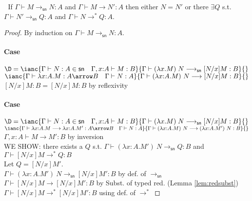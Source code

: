 \documentclass{article}
\newcommand{\csn}{\mathsf{sn}}
\newcommand{\mred}{\longrightarrow^*}
\newcommand{\red}{\longrightarrow}
\newcommand{\redsn}{\longrightarrow_\csn}
\begin{document}
\begin{lemma}[Confluence $\csn$]\label{lm:confsn}$\;$
If $\Gamma \vdash M \redsn N : A$ and $\Gamma \vdash M \red N' : A$
  then either $N = N'$ or
  there $\exists Q$ s.t. $\Gamma \vdash N'  \redsn Q : A$
        and $\Gamma \vdash N \mred Q : A$.
\end{lemma}
\begin{proof}
By induction on    $\Gamma \vdash M \redsn N : A$.

\paragraph{Case}
$\D = \ianc{\Gamma \vdash N : A \in \csn \quad \Gamma, x{:}A \vdash M : B}{\Gamma \vdash (\lambda x.M)\;N \redsn [N/x]M : B}{}$
\qquad
$\ianc{\Gamma \vdash \lambda x{:}A.M : A \arrow B \quad \Gamma \vdash  N : A}
      {\Gamma \vdash (\lambda x{:}A.M)~N  \red [N/x]M : B }{}$
\\[1em]
$[N/x]M : B = [N/x]M : B $ \hfill by reflexivity

\paragraph{Case}
$\D = \ianc{\Gamma \vdash N : A \in \csn \quad \Gamma, x{:}A \vdash M : B}{\Gamma \vdash (\lambda x.M)\;N \redsn [N/x]M : B}{}$
\qquad
$\ianc {\Gamma \vdash \lambda x{:}A.M \red \lambda x{:}A.M' : A \arrow B \quad \Gamma \vdash N : A}
       {\Gamma \vdash (\lambda x{:}A.M)~N  \red (\lambda x{:}A.M')~N : B}{}$
\\[0.5em]
$\Gamma, x{:}A \vdash M \red M' : B$ \hfill by inversion \\[0.5em]
WE SHOW: there exists a $Q$ s.t. $\Gamma \vdash (\lambda x{:}A.M')~N  \redsn Q : B$ and
                                 $\Gamma \vdash [N/x]M \mred Q : B$
\\[0.5em]
Let $Q = [N/x]M'$.  \\
$\Gamma \vdash (\lambda x{:}A.M')~N \redsn [N/x]M' : B$ \hfill by def. of $\redsn$\\
$\Gamma \vdash [N/x]M \red [N/x]M' : B$ \hfill by Subst. of typed red. (Lemma \ref{lem:redsubst})\\
$\Gamma \vdash [N/x]M \mred [N/x]M' : B$ \hfill using def. of $\mred$


\end{proof}
\end{document}
